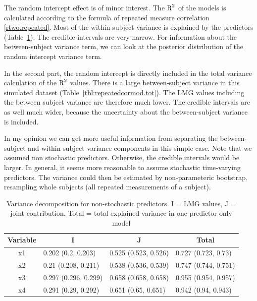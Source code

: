 \documentclass[11pt,a4paper,twoside]{book}
\begin{document}
The random intercept effect is of minor interest. The $\text{R}^2$ of the models is calculated according to the formula of repeated measure correlation \eqref{rtwo.repeated}.  Most of the within-subject variance is explained by the predictors (Table~\ref{tbl:repeatedcormod}). The credible intervals are very narrow. For information about the between-subject variance term, we can look at the posterior distribution of the random intercept variance term.

In the second part, the random intercept is directly included in the total variance calculation of the $\text{R}^2$ values. There is a large between-subject variance in this simulated dataset (Table~\ref{tbl:repeatedcormod.tot}). The LMG values including the between subject variance are  therefore much lower. The credible intervals are as well much wider, because the uncertainty about the between-subject variance is included. 

In my opinion we can get more useful information from separating the between-subject and within-subject variance components in this simple case. Note that we assumed non stochastic predictors. Otherwise, the credible intervals would be larger. In general, it seems more reasonable to assume stochastic time-varying predictors. The variance could then be estimated by non-parameteric bootstrap, resampling whole subjects (all repeated measurements of a subject).





\begin{table}[h]
\caption{Variance decomposition for non-stochastic predictors. I = LMG values, J = joint contribution, Total = total explained variance in one-predictor only model}
\centering
\begin{tabular}{clll}
  \toprule
  \multicolumn{1}{c}{\textbf{Variable}} & \multicolumn{1}{c}{\textbf{I}} &\multicolumn{1}{c}{\textbf{J}} & \multicolumn{1}{c}{\textbf{Total}} \\
  \hline
x1 & 0.202 (0.2, 0.203)  & 0.525 (0.523, 0.526)   & 0.727 (0.723, 0.73)  \\ 
x2 & 0.21 (0.208, 0.211)  & 0.538 (0.536, 0.539)   & 0.747 (0.744, 0.751)  \\ 
x3 & 0.297 (0.296, 0.299)  & 0.658 (0.658, 0.658)   & 0.955 (0.954, 0.957)  \\ 
x4 & 0.291 (0.29, 0.292)  & 0.651 (0.65, 0.651)   & 0.942 (0.94, 0.943)  \\ 
   \bottomrule
\end{tabular}
\label{tbl:repeatedcormod}
\end{table}
\end{document}
